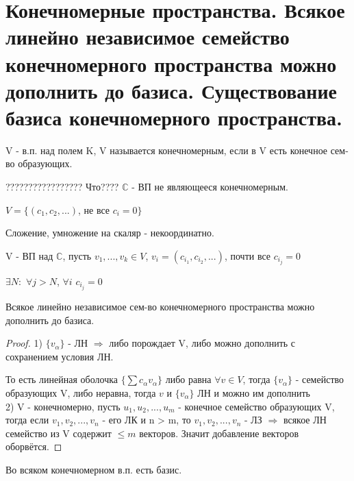 \documentclass[12pt, fleqn]{article}
\begin{document}
\section{Конечномерные пространства. Всякое линейно независимое семейство конечномерного пространства можно дополнить
    до базиса. Существование базиса конечномерного пространства.}

    \begin{definition}
        V - в.п. над полем K, V называется конечномерным, если в V есть конечное сем-во образующих.
    \end{definition}

    \begin{example}????????????????? Что????
        $\mathds{C}$ - ВП не являющееся конечномерным.

        $V=\{(c_1,c_2,...)$, не все $c_i=0\}$

        Сложение, умножение на скаляр - некоординатно.

        V - ВП над $\mathds{C}$, пусть $v_1,...,v_k \in V$, $v_i=(c_{i_1}, c_{i_2},...)$, почти все $c_{i_j}=0$

        $\exists N:$ $\forall j > N$, $\forall i$ $c_{i_j}=0$
    \end{example}

    \begin{theorem}
        Всякое линейно независимое сем-во конечномерного пространства можно дополнить до базиса.
    \end{theorem}

    \begin{proof}
        1) $\{v_\alpha\}$ - ЛН $\Rightarrow$ либо порождает V, либо можно дополнить с сохранением условия ЛН.

        То есть линейная оболочка $\{\sum c_\alpha v_\alpha\}$ либо равна $\forall v \in V$, тогда $\{v_\alpha\}$ - семейство образующих V, либо неравна, тогда $v$ и $\{v_\alpha\}$ ЛН и можно им дополнить
        \\
        2) V - конечномерно, пусть $u_1,u_2,...,u_m$ - конечное семейство образующих V, тогда если $v_1,v_2,...,v_n$ - его ЛК и n > m, то $v_1,v_2,...,v_n$ - ЛЗ $\Rightarrow$ всякое ЛН семейство из V содержит $\leqslant m$ векторов. Значит добавление векторов оборвётся.
    \end{proof}


    \begin{consequence}
        Во всяком конечномерном в.п. есть базис.
    \end{consequence}
\end{document}
